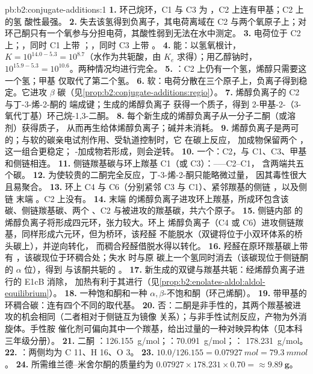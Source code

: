 \begin{solution}{pb:b2:conjugate-additions:1}
\textbf{1.} 环己烷环，C1 与 C3 为 ，C2 上连有甲基；C2 上的氢
酸性最强。
\textbf{2.} 失去该氢得到负离子，其电荷离域在 C2 与两个氧原子上；对
环己酮只有一个氧参与分担电荷，其酸性弱到无法在水中测定。
\textbf{3.} 电荷位于 C2 上；，同时 C1 上带 ；，同时 C3 上带 。
\textbf{4.} 能：以氢氧根计，$K = 10^{14.0 - 5.3} = 10^{8.7}$（水作为共轭酸，由
$K_e$ 求得）；用乙醇钠时，$10^{15.9-5.3} = 10^{10.6}$。两种情况均进行完全。
\textbf{5.} ：C2 上仍有一个氢，烯醇只需要这一个氢；甲基
仅取代了第二个氢。
\textbf{6.} 软：电荷分散在三个原子上，负离子得到稳定。它进攻
$\beta$ 碳（见\cref{prop:b2:conjugate-additions:regio}）。
\textbf{7.} 烯醇负离子的 C2 与丁-3-烯-2-酮的  端成键；生成的烯醇负离子
获得一个质子，得到 2-甲基-2-（3-氧代丁基）环己烷-1,3-二酮。
\textbf{8.} 每个新生成的烯醇负离子从一分子二酮（或溶剂）获得质子，
从而再生给体烯醇负离子；碱并未消耗。
\textbf{9.} 烯醇负离子是两可的；与软的碳亲电试剂作用、受轨道控制时，它
在碳上反应， 加成物保留两个 ，这一组合更稳定；
-加成物若形成，则会逆转。
\textbf{10.} 一个：C2，与 C1、C3、甲基和侧链相连。
\textbf{11.} 侧链羰基碳与环上羰基 C1（或 C3）：------C2--C1，
含两端共五个碳。
\textbf{12.} 为使较贵的二酮完全反应，丁-3-烯-2-酮只能略微过量，
因其毒性很大且易聚合。
\textbf{13.} 环上 C4 与 C6（分别紧邻 C3 与 C1）、紧邻羰基的侧链 ，以及侧链
末端 。C2 上没有。
\textbf{14.} 末端  的烯醇负离子进攻环上羰基，所成环包含该
碳、侧链羰基碳、两个 、C2 与被进攻的羰基碳，共六个原子。
\textbf{15.} 侧链内部  的烯醇负离子将形成四元环，张力较大。环上
烯醇负离子（C4 或 C6）进攻侧链羰基，同样形成六元环，但为桥环，该羟醛
不能脱水（双键将位于小双环体系的桥头碳上），并逆向转化，
而稠合羟醛借脱水得以转化。
\textbf{16.} 羟醛在原环羰基碳上带有 ，该碳现位于环稠合处；失水
时与原  碳上一个氢同时消去（该碳现位于侧链酮的 $\alpha$ 位），得到
与该酮共轭的 。
\textbf{17.} 新生成的双键与羰基共轭：经烯醇负离子进行的 E1cB 消除，
加热有利于其进行（见\cref{prop:b2:enolates-aldol:aldol-equilibrium}）。
\textbf{18.} 一种饱和酮和一种 $\alpha,\beta$-不饱和酮（环己烯酮）。
\textbf{19.} 带甲基的环稠合碳：连有四个不同的取代基。
\textbf{20.} 否：二酮是非手性的，其两个羰基被进攻的机会相同（二者相对于侧链互为镜像
关系）；与非手性试剂反应，产物为外消旋体。手性胺
催化剂可偏向其中一个羰基，给出过量的一种对映异构体（见本科三年级分册）。
\textbf{21.} 二酮 ：\qty{126.155}{g/mol}；：\qty{70.091}{g/mol}；：
\qty{178.231}{g/mol}。
\textbf{22.} ：两侧均为 C 11、H 16、O 3。
\textbf{23.} $10.0/126.155 = \qty{0.07927}{mol} = \qty{79.3}{mmol}$。
\textbf{24.} 所需维兰德–米舍尔酮的质量约为
$0.07927 \times 178.231 \times 0.70 = \boldsymbol{\approx \qty{9.89}{g}}$。
\end{solution}
